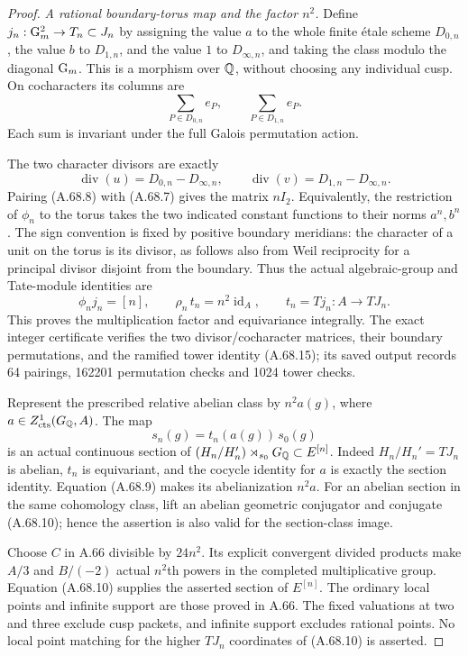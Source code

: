 \begin{proof}
\emph{A rational boundary-torus map and the factor $n^2$.}
Define $j_n:\mathrm G_m^2\to T_n\subset J_n$ by assigning the value $a$
to the whole finite \'etale scheme $D_{0,n}$, the value $b$ to
$D_{1,n}$, and the value $1$ to $D_{\infty,n}$, and taking the
class modulo the diagonal $\mathrm G_m$.
This is a morphism over $\mathbb Q$, without choosing any individual cusp.
On cocharacters its columns are
\[
          \sum_{P\in D_{0,n}}e_P,\qquad
          \sum_{P\in D_{1,n}}e_P.
 \tag{A.68.7}
\]
Each sum is invariant under the full Galois permutation action.

The two character divisors are exactly
\[
             \operatorname{div}(u)=D_{0,n}-D_{\infty,n},
 \qquad       \operatorname{div}(v)=D_{1,n}-D_{\infty,n}.
 \tag{A.68.8}
\]
Pairing (A.68.8) with (A.68.7) gives the matrix $nI_2$.
Equivalently, the restriction of $\phi_n$ to the torus takes the
two indicated constant functions to their norms $a^n,b^n$.
The sign convention is fixed by positive boundary meridians:
the character of a unit on the torus is its divisor, as follows
also from Weil reciprocity for a principal divisor disjoint from
the boundary.
Thus the actual algebraic-group and Tate-module identities are
\[
       \phi_n j_n=[n],\qquad
       \rho_n\,t_n=n^2\operatorname{id}_A,\qquad
                          t_n=Tj_n:A\to TJ_n .
 \tag{A.68.9}
\]
This proves the multiplication factor and equivariance integrally.
The exact integer certificate
 verifies the two
divisor/cocharacter matrices, their boundary permutations, and
the ramified tower identity (A.68.15); its saved output records
64 pairings, 162201 permutation checks and 1024 tower checks.

Represent the prescribed relative abelian class by $n^2a(g)$, where
$a\in Z^1_{\rm cts}(G_\mathbb Q,A)$.
The map
\[
                      s_n(g)=t_n(a(g))\,s_0(g)
 \tag{A.68.10}
\]
is an actual continuous section of
$(H_n/H_n')\rtimes_{s_0}G_\mathbb Q\subset E^{[n]}$.
Indeed $H_n/H_n'=TJ_n$ is abelian, $t_n$ is equivariant, and
the cocycle identity for $a$ is exactly the section identity.
Equation (A.68.9) makes its abelianization $n^2a$.
For an abelian section in the same cohomology class, lift an abelian
geometric conjugator and conjugate (A.68.10); hence the assertion is
also valid for the section-class image.

Choose $C$ in A.66 divisible by $24n^2$.
Its explicit convergent divided products make $A/3$ and $B/(-2)$
actual $n^2$th powers in the completed multiplicative group.
Equation (A.68.10) supplies the asserted section of $E^{[n]}$.
The ordinary local points and infinite support are those proved
in A.66.  The fixed valuations at two and three exclude cusp packets,
and infinite support excludes rational points.
No local point matching for the higher $TJ_n$ coordinates of
(A.68.10) is asserted.


\end{proof}
